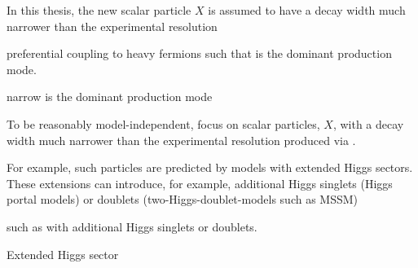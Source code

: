 In this thesis, the new scalar particle $X$ is assumed to have a decay width
much narrower than the experimental resolution

preferential coupling to heavy fermions such that \ggF is the dominant
production mode.


narrow \ggF is the dominant production mode

To be reasonably model-independent, focus on scalar particles, $X$, with a decay
width much narrower than the experimental resolution produced via \ggF.

For example, such particles are predicted by models with extended Higgs
sectors. These extensions can introduce, for example, additional Higgs singlets
(Higgs portal models) or doublets (two-Higgs-doublet-models such as MSSM)

such as with additional Higgs singlets or doublets.

Extended Higgs sector




